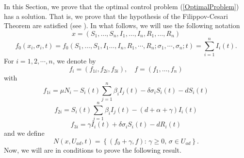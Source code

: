 \documentclass[a4paper,10pt]{article}
\theoremstyle{remark}
\begin{document}
In this Section, we prove that the optimal control problem (\ref{OptimalProblem}) has a solution. That is, we prove that the hypothesis of the Filippov-Cesari Theorem are satisfied (see \cite{A.Seierstad499}). In what follows, we will use the following notation
$$
x=\left(S_{1}, \ldots, S_{n}, I_{1}, \ldots, I_{n}, R_{1},\ldots, R_{n}\right)
$$
\[f_{0}\left(x_{i}, \sigma_{i}, t\right)=f_{0}\left(S_{1}, \ldots, S_{1}, I_{1}\ldots, I_n, R_{1}, \cdots, R_{n} ; \sigma_{1}, \cdots, \sigma_{n} ; t\right)=\sum_{i=1}^{n} I_{i}(t).\]
For $i=1,2,\cdots, n$, we denote by
$$
f_{i}=\left(f_{1 i}, f_{2 i}, f_{3 i}\right), \quad  f=\left(f_{1}, \ldots, f_{n}\right) 
$$
with
\[f_{1 i}=\mu N_{i}-S_{i}(t) \sum_{j=1}^{n} \beta_{i} I_{j}(t)-\delta \sigma_{i} S_{i}(t)-d S_{i}(t)\]
\[f_{2i}=S_{i}(t) \sum_{j=1}^{n} \beta_{i} I_{j}(t)-(d+\alpha+\gamma) I_{i}(t)\]
\[f_{3 i}=\gamma I_{i}(t)+\delta \sigma_{i} S_{i}(t)-d R_{i}(t)\]
and we define
$$N\left(x, U_{a d}, t\right)=\left\{\left(f_{0}+\gamma, f\right):\, \gamma \geq 0,\, \sigma \in U_{a d}\right\}.$$
Now, we will are in conditions to prove the following result.
\end{document}
